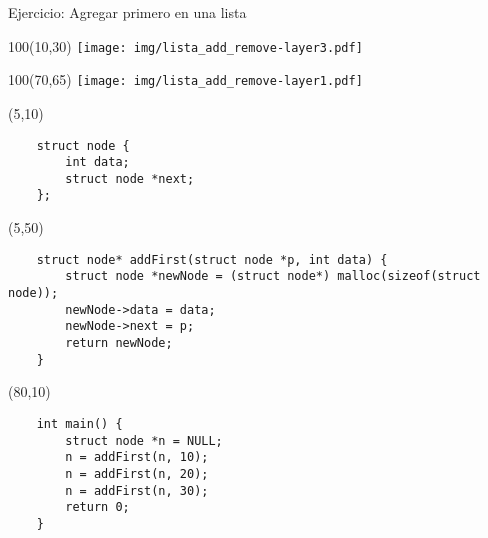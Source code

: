 \documentclass[aspectratio=169]{beamer}
\begin{document}
\begin{frame}[fragile]{Ejercicio: Agregar primero en una lista}
    \begin{textblock}{100}(10,30) \texttt{[image: img/lista\_add\_remove-layer3.pdf]} \end{textblock}
    \begin{textblock}{100}(70,65) \texttt{[image: img/lista\_add\_remove-layer1.pdf]} \end{textblock}
    \begin{textblock}{60}(5,10)
    \small
    \begin{verbatim}
    struct node {
        int data;
        struct node *next;
    };
    \end{verbatim}
    \end{textblock}
    \begin{textblock}{60}(5,50)
    \small
    \begin{verbatim}
    struct node* addFirst(struct node *p, int data) {
        struct node *newNode = (struct node*) malloc(sizeof(struct node));
        newNode->data = data;
        newNode->next = p;
        return newNode;
    }
    \end{verbatim}
    \end{textblock}
    \begin{textblock}{60}(80,10)
    \small
    \begin{verbatim}
    int main() {
        struct node *n = NULL;
        n = addFirst(n, 10);
        n = addFirst(n, 20);
        n = addFirst(n, 30);
        return 0;
    }
    \end{verbatim}
    \end{textblock}
\end{frame}
\end{document}
